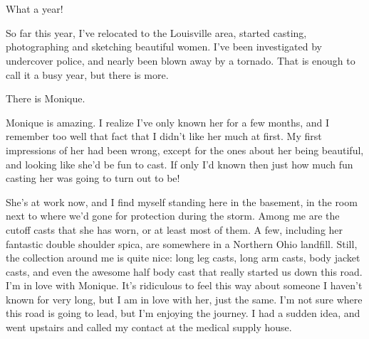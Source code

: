 \chapter{}
What a year!

So far this year, I've relocated to the Louisville area, started casting, photographing and
sketching beautiful women. I've been investigated by undercover police, and nearly been blown
away by a tornado. That is enough to call it a busy year, but there is more.

There is Monique.

Monique is amazing. I realize I've only known her for a few months, and I remember too well
that fact that I didn't like her much at first. My first impressions of her had been wrong,
except for the ones about her being beautiful, and looking like she'd be fun to cast. If only
I'd known then just how much fun casting her was going to turn out to be!

She's at work now, and I find myself standing here in the basement, in the room next to
where we'd gone for protection during the storm. Among me are the cutoff casts that she has
worn, or at least most of them. A few, including her fantastic double shoulder spica, are
somewhere in a Northern Ohio landfill. Still, the collection around me is quite nice: long leg
casts, long arm casts, body jacket casts, and even the awesome half body cast that really
started us down this road. I'm in love with Monique. It's ridiculous to feel this way about
someone I haven't known for very long, but I am in love with her, just the same. I'm not sure
where this road is going to lead, but I'm enjoying the journey. I had a sudden idea, and went
upstairs and called my contact at the medical supply house.

